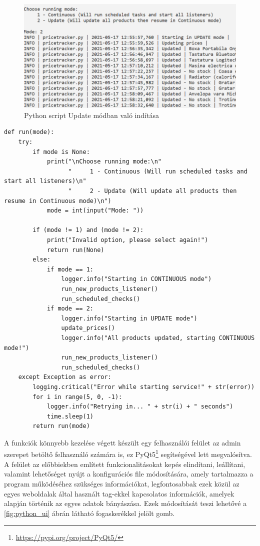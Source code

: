 \begin{figure}[H]
    \centering
    \includegraphics[scale=0.9]{figures/images/python_start.png}
    \caption{Python script Update módban való indítása}
    \label{fig:python_start}
\end{figure}

\begin{lstlisting}[caption={Backend szolgáltatás indítása}, label={lst:python_start}, basicstyle=\footnotesize]
    def run(mode):
    try:
        if mode is None:
            print("\nChoose running mode:\n"
                  "     1 - Continuous (Will run scheduled tasks and start all listeners)\n"
                  "     2 - Update (Will update all products then resume in Continuous mode)\n")
            mode = int(input("Mode: "))

        if (mode != 1) and (mode != 2):
            print("Invalid option, please select again!")
            return run(None)
        else:
            if mode == 1:
                logger.info("Starting in CONTINUOUS mode")
                run_new_products_listener()
                run_scheduled_checks()
            if mode == 2:
                logger.info("Starting in UPDATE mode")
                update_prices()
                logger.info("All products updated, starting CONTINUOUS mode!")
                run_new_products_listener()
                run_scheduled_checks()
    except Exception as error:
        logging.critical("Error while starting service!" + str(error))
        for i in range(5, 0, -1):
            logger.info("Retrying in... " + str(i) + " seconds")
            time.sleep(1)
        return run(mode)
\end{lstlisting}

A funkciók könnyebb kezelése végett készült egy felhasználói felület az admin szerepet betöltő felhasználó számára is, ez PyQt5\footnote{\url{https://pypi.org/project/PyQt5/}} segítségével lett megvalósítva. A felület az előbbiekben említett funkcionalitásokat kepés elindítani, leállítani, valamint lehetőséget nyújt a konfigurációs file módosítására, amely tartalmazza a program működéséhez szükséges információkat, legfontosabbak ezek közül az egyes weboldalak által használt tag-ekkel kapcsolatos információk, amelyek alapján történik az egyes adatok bányászása. Ezek módosítását teszi lehetővé a \ref{fig:python_ui} ábrán látható fogaskerékkel jelölt gomb.  

